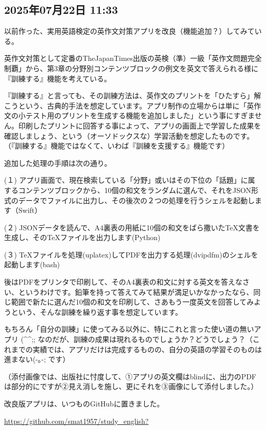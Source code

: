 \subsection*{2025年07月22日 11:33}

以前作った、実用英語検定の英作文対策アプリを改良（機能追加？）してみている。

英作文対策として定番のTheJapanTimes出版の英検（準）一級「英作文問題完全制覇」から、第3章の分野別コンテンツブロックの例文を英文で答えられる様に『訓練する』機能を考えている。

『訓練する』と言っても、その訓練方法は、英作文のプリントを「ひたすら」解こうという、古典的手法を想定しています。アプリ制作の立場からは単に「英作文の小テスト用のプリントを生成する機能を追加しました」という事にすぎません。印刷したプリントに回答する事によって、アプリの画面上で学習した成果を確認しましょう、という（オーソドックスな）学習活動を想定したものです。（『訓練する』機能ではなくて、いわば『訓練を支援する』機能です）

追加した処理の手順は次の通り。

(１) アプリ画面で、現在検索している「分野」或いはその下位の「話題」に属するコンテンツブロックから、10個の和文をランダムに選んで、それをJSON形式のデータでファイルに出力し、その後次の２つの処理を行うシェルを起動します（Swift）

(２) JSONデータを読んで、A4裏表の用紙に10個の和文をばら撒いたTeX文書を生成し、そのTeXファイルを出力します(Python)

(３) TeXファイルを処理(uplatex)してPDFを出力する処理(dvipdfm)のシェルを起動します(bash)

後はPDFをプリンタで印刷して、そのA4裏表の和文に対する英文を答えなさい、というわけです。鉛筆を持って答えてみて結果が満足いかなかったなら、同じ範囲で新たに選んだ10個の和文を印刷して、さあもう一度英文を回答してみようという、そんな訓練を繰り返す事を想定しています。

もちろん「自分の訓練」に使ってみる以外に、特にこれと言った使い道の無いアプリ (\textasciicircum{}\textasciicircum{};; なのだが、訓練の成果は現れるものでしょうか？どうでしょう？（これまでの実績では、アプリだけは完成するものの、自分の英語の学習そのものは進まない(-｡-; です）

（添付画像では、出版社に忖度して、①アプリの英文欄はblindに、出力のPDFは部分的にですが②見え消しを施し、更にそれを③画像にして添付しました。）

改良版アプリは、いつものGitHubに置きました。

\url{https://github.com/smat1957/study_english?}

